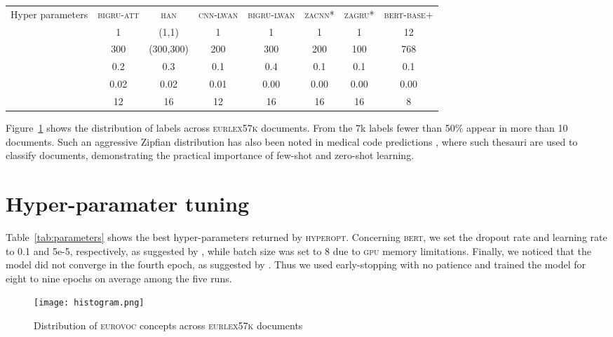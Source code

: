 \documentclass[11pt,a4paper]{article}
\newcommand{\bigruatt}{\textsc{bigru-att}\xspace}
\newcommand{\han}{\textsc{han}\xspace}
\newcommand{\zacnn}{\textsc{zacnn}\xspace}
\newcommand{\zagru}{\textsc{zagru}\xspace}
\newcommand{\lwancnn}{\textsc{cnn-lwan}\xspace}
\newcommand{\lwangru}{\textsc{bigru-lwan}\xspace}
\newcommand{\bert}{\textsc{bert}\xspace}
\newcommand{\bertbase}{\textsc{bert-base}\xspace}
\newcommand{\newdata}{\textsc{eurlex57k}\xspace}
\newcommand{\eurovoc}{\textsc{eurovoc}\xspace}
\newcommand{\gpu}{\textsc{gpu}\xspace}
\begin{document}
\begin{table*}[h]
\centering
{
\small
\begin{tabular}{lccccccc}
  \hline
  Hyper parameters & \bigruatt & \han & \lwancnn & \lwangru & \zacnn* & \zagru* & \bertbase+ \\
   & 1 & (1,1) & 1 & 1 & 1 & 1 & 12 \\
   & 300 & (300,300) & 200 & 300 & 200 & 100 & 768 \\
   & 0.2 & 0.3 & 0.1 & 0.4 & 0.1 & 0.1 & 0.1 \\
   & 0.02 & 0.02 & 0.01 & 0.00 & 0.00 & 0.00 & 0.00 \\
   & 12 & 16 & 12 & 16 & 16 & 16 & 8 \\
  \hline
 \end{tabular}
 }
  \caption{Best hyper parameters for neural methods. : number of layers, : hidden units size, : dropout rate across dimensions, : dropout rate of word embeddings, : batch size. * Hidden units size is fixed to word embedding dimensionality, + ,  are fixed from the pre-trained model. Dropout rate fixed as suggested by Devlin et al. (2018).}
\label{tab:parameters}
\end{table*}

Figure~\ref{fig:histogram} shows the distribution of labels across \newdata documents. From the 7k labels fewer than 50\% appear in more than 10 documents. Such an aggressive Zipfian distribution has also been noted in medical code predictions \cite{Rios2018-2}, where such thesauri are used to classify documents, demonstrating the practical importance of few-shot and zero-shot learning. 

\section{Hyper-paramater tuning}
\label{app:hyperopt}
Table~\ref{tab:parameters} shows the best hyper-parameters returned by \textsc{hyperopt}. Concerning \bert, we set the dropout rate and learning rate to 0.1 and 5e-5, respectively, as suggested by \citet{bert}, while batch size was set to 8 due to \gpu memory limitations. Finally, we noticed that the model did not converge in the fourth epoch, as suggested by \citet{bert}. Thus we used early-stopping with no patience and trained the model for eight to nine epochs on average among the five runs. 

\begin{figure}[t!]
  \centering
    \texttt{[image: histogram.png]}
  \caption{Distribution of \eurovoc concepts across \newdata documents}
  \label{fig:histogram}
\end{figure}
\end{document}
